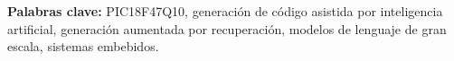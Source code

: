 


\vspace{1.5\baselineskip}

\noindent\textbf{Palabras clave:} PIC18F47Q10, generación de código asistida por
inteligencia artificial, generación aumentada por recuperación, modelos de
lenguaje de gran escala, sistemas embebidos.
